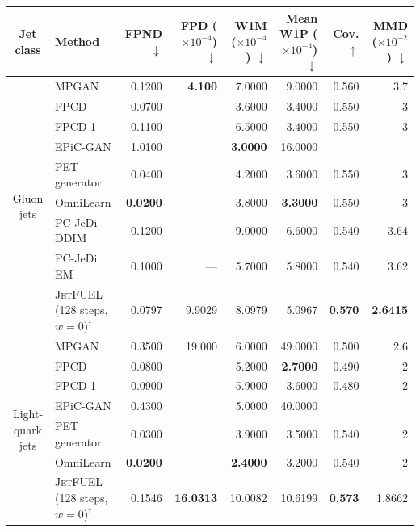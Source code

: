 \documentclass[10pt]{article}
\begin{document}
\begin{landscape}
\thispagestyle{empty}
\begin{center}
\footnotesize
\setlength{\tabcolsep}{3pt}
\renewcommand{\arraystretch}{1.0}
\parbox{0.80\linewidth}{}
\medskip
\begin{tabular}{@{}clrrrrrr@{}}
\toprule
Jet class & Method & FPND $\downarrow$ & FPD ($\times 10^{-4}$) $\downarrow$ & W1M ($\times 10^{-4}$) $\downarrow$ & Mean W1P ($\times 10^{-4}$) $\downarrow$ & Cov. $\uparrow$ & MMD ($\times 10^{-2}$) $\downarrow$ \\
\midrule
\multirow{9}{*}{Gluon jets} & MPGAN & 0.1200 & \textbf{4.100} & 7.0000 & 9.0000 & 0.560 & 3.7 \\
 & FPCD & 0.0700 & \textemdash{} & 3.6000 & 3.4000 & 0.550 & 3 \\
 & FPCD 1 & 0.1100 & \textemdash{} & 6.5000 & 3.4000 & 0.550 & 3 \\
 & EPiC-GAN & 1.0100 & \textemdash{} & \textbf{3.0000} & 16.0000 & \textemdash{} & \textemdash{} \\
 & PET generator & 0.0400 & \textemdash{} & 4.2000 & 3.6000 & 0.550 & 3 \\
 & OmniLearn & \textbf{0.0200} & \textemdash{} & 3.8000 & \textbf{3.3000} & 0.550 & 3 \\
 & PC-JeDi DDIM & 0.1200 & --- & 9.0000 & 6.6000 & 0.540 & 3.64 \\
 & PC-JeDi EM & 0.1000 & --- & 5.7000 & 5.8000 & 0.540 & 3.62 \\
\cmidrule(l){2-8}
 & \textsc{JetFUEL} (128 steps, $w=0$)$^\dagger$ & 0.0797 & 9.9029 & 8.0979 & 5.0967 & \textbf{0.570} & \textbf{2.6415} \\
\midrule
\multirow{8}{*}{Light-quark jets} & MPGAN & 0.3500 & 19.000 & 6.0000 & 49.0000 & 0.500 & 2.6 \\
 & FPCD & 0.0800 & \textemdash{} & 5.2000 & \textbf{2.7000} & 0.490 & 2 \\
 & FPCD 1 & 0.0900 & \textemdash{} & 5.9000 & 3.6000 & 0.480 & 2 \\
 & EPiC-GAN & 0.4300 & \textemdash{} & 5.0000 & 40.0000 & \textemdash{} & \textemdash{} \\
 & PET generator & 0.0300 & \textemdash{} & 3.9000 & 3.5000 & 0.540 & 2 \\
 & OmniLearn & \textbf{0.0200} & \textemdash{} & \textbf{2.4000} & 3.2000 & 0.540 & 2 \\
\cmidrule(l){2-8}
 & \textsc{JetFUEL} (128 steps, $w=0$)$^\dagger$ & 0.1546 & \textbf{16.0313} & 10.0082 & 10.6199 & \textbf{0.573} & 1.8662 \\

\end{tabular}
\end{center}
\end{landscape}
\end{document}
